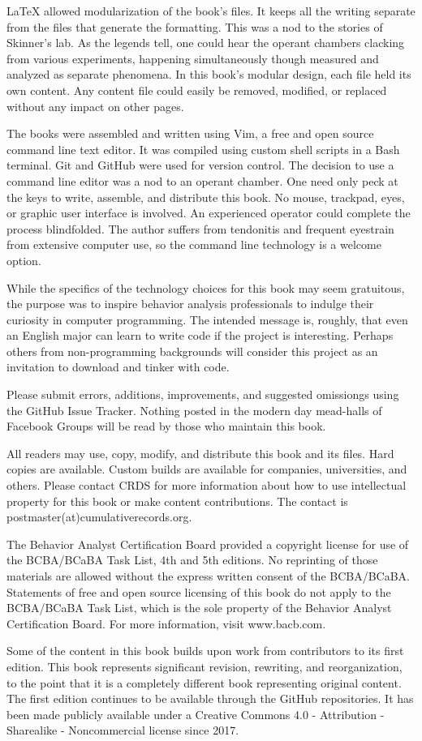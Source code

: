 \LaTeX{} allowed modularization of the book's files. It keeps all the writing separate from the files that generate the formatting. This was a nod to the stories of Skinner's lab. As the legends tell, one could hear the operant chambers clacking from various experiments, happening simultaneously though measured and analyzed as separate phenomena. In this book's modular design, each file held its own content. Any content file could easily be removed, modified, or replaced without any impact on other pages.


The books were assembled and written using Vim, a free and open source command line text editor. It was compiled using custom shell scripts in a Bash terminal. Git and GitHub were used for version control. The decision to use a command line editor was a nod to an operant chamber. One need only peck at the keys to write, assemble, and distribute this book. No mouse, trackpad, eyes, or graphic user interface is involved. An experienced operator could complete the process blindfolded. The author suffers from tendonitis and frequent eyestrain from extensive computer use, so the command line technology is a welcome option.


While the specifics of the technology choices for this book may seem gratuitous, the purpose was to inspire behavior analysis professionals to indulge their curiosity in computer programming. The intended message is, roughly, that even an English major can learn to write code if the project is interesting. Perhaps others from non-programming backgrounds will consider this project as an invitation to download and tinker with code.

Please submit errors, additions, improvements, and suggested omissiongs using the GitHub Issue Tracker. Nothing posted in the modern day mead-halls of Facebook Groups will be read by those who maintain this book.

All readers may use, copy, modify, and distribute this book and its files. Hard copies are available. Custom builds are available for companies, universities, and others. Please contact CRDS for more information about how to use intellectual property for this book or make content contributions. The contact is postmaster(at)cumulativerecords.org.

The Behavior Analyst Certification Board provided a copyright license for use of the BCBA/BCaBA Task List, 4th and 5th editions. No reprinting of those materials are allowed without the express written consent of the BCBA/BCaBA. Statements of free and open source licensing of this book do not apply to the BCBA/BCaBA Task List, which is the sole property of the Behavior Analyst Certification Board. For more information, visit www.bacb.com.

Some of the content in this book builds upon work from contributors to its first edition. This book represents significant revision, rewriting, and reorganization, to the point that it is a completely different book representing original content. The first edition continues to be available through the GitHub repositories. It has been made publicly available under a Creative Commons 4.0 - Attribution - Sharealike - Noncommercial license since 2017.
\clearpage
